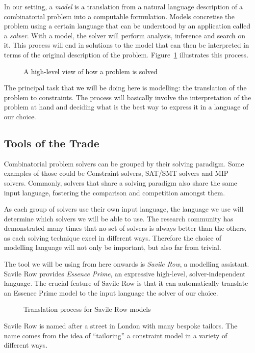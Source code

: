 In our setting, a \emph{model} is a translation from a natural language
description of a combinatorial problem into a computable formulation. Models
concretise the problem using a certain language that can be understood by an
application called a \emph{solver}. 
With a model, the solver will perform
analysis, inference and search on it. This process will end in solutions to the
model that can then be interpreted in terms of the original description of the
problem. Figure~\ref{fig-modelling} illustrates this process.

\begin{figure}
    \centering
    
    \label{fig-modelling}
    \caption{A high-level view of how a problem is solved}
\end{figure}

The principal task that we will be doing here is modelling: the translation of
the problem to constraints. The process will basically involve the
interpretation of the problem at hand and deciding what is the best way to
express it in a language of our choice.

\subsection{Tools of the Trade}

Combinatorial problem solvers can be grouped by their solving paradigm. Some
examples of those could be Constraint solvers, SAT/SMT solvers and MIP solvers.
Commonly, solvers that share a solving paradigm also share the same input
language, fostering the comparison and competition amongst them. 

As each group of solvers use their own input language, the language we use will
determine which solvers we will be able to use.
The research community has demonstrated many times that no set of solvers is
always better than the others, as each solving technique excel in different
ways. Therefore the choice of modelling language will not only be important, but
also far from trivial.

The tool we will be using from here onwards is \emph{Savile Row}, a modelling
assistant. Savile Row provides \emph{Essence Prime}, an expressive high-level,
solver-independent language. The crucial feature of Savile Row is that it can
automatically translate an Essence Prime model to the input language the solver
of our choice.

\begin{figure}
    \centering
    
    \label{fig-sr}
    \caption{Translation process for Savile Row models}
\end{figure}

Savile Row is named after a street in London with many bespoke tailors. The
name comes from the idea of ``tailoring'' a constraint model in a variety of
different ways.

